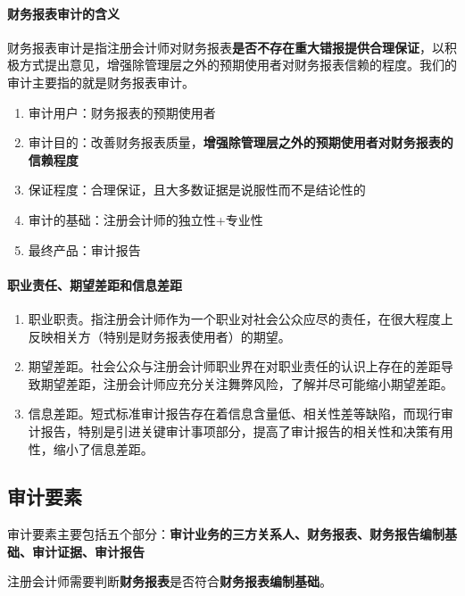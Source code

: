 \documentclass[UTF8,12pt]{ctexart}
\numberwithin{equation}{section} %
\numberwithin{figure}{section}
\numberwithin{table}{section}
\begin{document}
	\paragraph{财务报表审计的含义}财务报表审计是指注册会计师对财务报表\textbf{是否不存在重大错报提供合理保证}，以积极方式提出意见，增强除管理层之外的预期使用者对财务报表信赖的程度。我们的审计主要指的就是财务报表审计。
	
	\begin{enumerate}
		\item 审计用户：财务报表的预期使用者
		
		\item 审计目的：改善财务报表质量，\textbf{增强除管理层之外的预期使用者对财务报表的信赖程度}
		
		\item 保证程度：合理保证，且大多数证据是说服性而不是结论性的
		
		\item 审计的基础：注册会计师的独立性+专业性
		
		\item 最终产品：审计报告
	\end{enumerate}
	
	
	\paragraph{职业责任、期望差距和信息差距}
	\begin{enumerate}
		\item 职业职责。指注册会计师作为一个职业对社会公众应尽的责任，在很大程度上反映相关方（特别是财务报表使用者）的期望。
		
		\item 期望差距。社会公众与注册会计师职业界在对职业责任的认识上存在的差距导致期望差距，注册会计师应充分关注舞弊风险，了解并尽可能缩小期望差距。
		
		\item 信息差距。短式标准审计报告存在着信息含量低、相关性差等缺陷，而现行审计报告，特别是引进关键审计事项部分，提高了审计报告的相关性和决策有用性，缩小了信息差距。
	\end{enumerate}
	
	
	\subsection{审计要素}
	审计要素主要包括五个部分：\textbf{审计业务的三方关系人、财务报表、财务报告编制基础、审计证据、审计报告}
	
	注册会计师需要判断\textbf{财务报表}是否符合\textbf{财务报表编制基础}。
	
\end{document}
